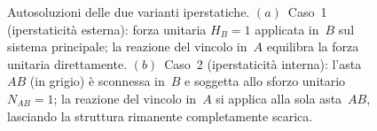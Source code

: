 \begin{figure}
{
			}
			\caption{Autosoluzioni delle due varianti iperstatiche.
				$(a)$~Caso~1 (iperstaticità esterna): forza unitaria
				$H_B = 1$ applicata in~$B$ sul sistema principale;
				la reazione del vincolo in~$A$ equilibra la forza
				unitaria direttamente.
				$(b)$~Caso~2 (iperstaticità interna): l'asta~$AB$
				(in grigio) è sconnessa in~$B$ e soggetta allo
				sforzo unitario $N_{AB} = 1$; la reazione del
				vincolo in~$A$ si applica alla sola asta~$AB$,
				lasciando la struttura rimanente completamente
				scarica.}
			\label{fig:capriata_autosoluzioni}
		\end{figure}
